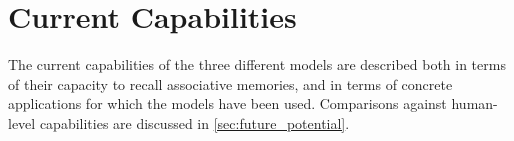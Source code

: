 \section{Current Capabilities}

The current capabilities of the three different models are described both in terms of their capacity to recall associative memories, and in terms of concrete applications for which the models have been used. Comparisons against human-level capabilities are discussed in \ref{sec:future_potential}.





